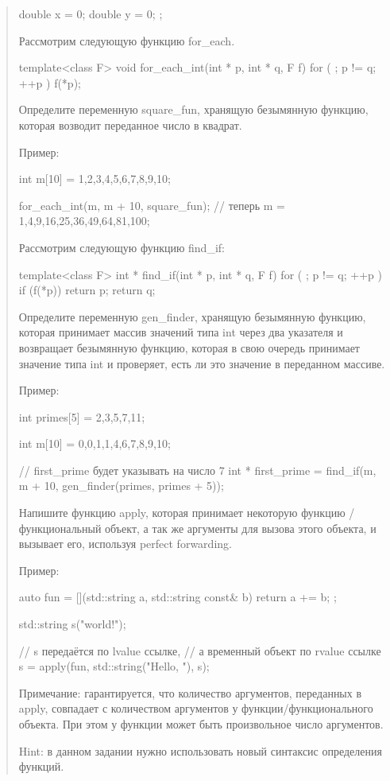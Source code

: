 \documentclass[]{article}
\begin{document}
\begin{quote}
{    double x = 0;
    double y = 0;
};



Рассмотрим следующую функцию for_each.

template<class F>
void for_each_int(int * p, int * q, F f)
{
    for ( ; p != q; ++p )
        f(*p);
}

Определите переменную square_fun, хранящую безымянную функцию, которая возводит переданное число в квадрат.

Пример:

int m[10] = {1,2,3,4,5,6,7,8,9,10};

for_each_int(m, m + 10, square_fun); // теперь m = {1,4,9,16,25,36,49,64,81,100};

Рассмотрим следующую функцию find_if:

template<class F>
int * find_if(int * p, int * q, F f)
{
    for ( ; p != q; ++p )
        if (f(*p))
            return p;
    return q;
}

Определите переменную gen_finder, хранящую безымянную функцию, которая принимает массив значений типа int через два указателя и возвращает безымянную функцию, которая в свою очередь принимает значение типа int и проверяет, есть ли это значение в переданном массиве.

Пример:

int primes[5] = {2,3,5,7,11};

int m[10] = {0,0,1,1,4,6,7,8,9,10};

// first_prime будет указывать на число 7
int * first_prime = find_if(m, m + 10, gen_finder(primes, primes + 5));






Напишите функцию apply, которая принимает некоторую функцию / функциональный объект, а так же аргументы для вызова этого объекта, и вызывает его, используя perfect forwarding.

Пример:

auto fun = [](std::string a, std::string const& b) { return a += b; };

std::string s("world!");

// s передаётся по lvalue ссылке,
// а временный объект по rvalue ссылке 
s = apply(fun, std::string("Hello, "), s);

Примечание: гарантируется, что количество аргументов, переданных в apply, совпадает с количеством аргументов у функции/функционального объекта. При этом у функции может быть произвольное число аргументов.

Hint: ﻿в данном задании нужно использовать новый синтаксис определения функций.


\end{quote}
\end{document}
